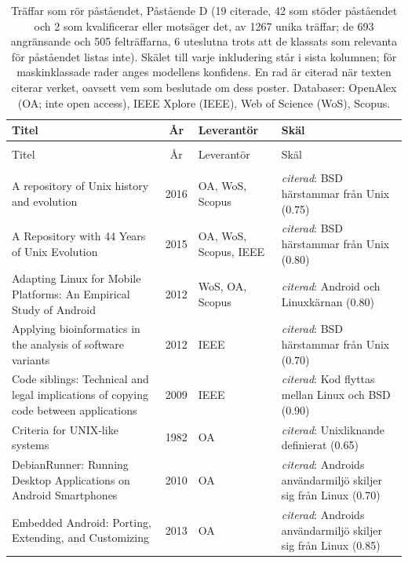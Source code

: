 \begin{longtable}{@{}%
  >{\raggedright\arraybackslash}p{}c%
  >{\raggedright\arraybackslash}p{}%
  >{\raggedright\arraybackslash}p{}@{}}
\caption{Träffar som rör påståendet, Påstående D (19 citerade, 42 som stöder påståendet och 2 som kvalificerar eller motsäger det, av 1267 unika träffar; de 693 angränsande och 505 felträffarna, 6 uteslutna trots att de klassats som relevanta för påståendet listas inte). Skälet till varje inkludering står i sista kolumnen; för maskinklassade rader anges modellens konfidens. En rad är citerad när texten citerar verket, oavsett vem som beslutade om dess poster. Databaser: OpenAlex (OA; inte open access), IEEE Xplore (IEEE), Web of Science (WoS), Scopus.}\label{tab:sok-unix-lineage}\\
\toprule
Titel & År & Leverantör & Skäl \\
\midrule
\endfirsthead
\multicolumn{4}{@{}l}{\emph{\tablename~\thetable{} (forts.)}}\\
\toprule
Titel & År & Leverantör & Skäl \\
\midrule
\endhead
\midrule \multicolumn{4}{r@{}}{\emph{forts.\ på nästa sida}}\\
\endfoot
\bottomrule
\endlastfoot
A repository of Unix history and evolution & 2016 & OA, WoS, Scopus & \emph{citerad}: BSD härstammar från Unix (0.75) \\
A Repository with 44 Years of Unix Evolution & 2015 & OA, WoS, Scopus, IEEE & \emph{citerad}: BSD härstammar från Unix (0.80) \\
Adapting Linux for Mobile Platforms: An Empirical Study of Android & 2012 & WoS, OA, Scopus & \emph{citerad}: Android och Linuxkärnan (0.80) \\
Applying bioinformatics in the analysis of software variants & 2012 & IEEE & \emph{citerad}: BSD härstammar från Unix (0.70) \\
Code siblings: Technical and legal implications of copying code between applications & 2009 & IEEE & \emph{citerad}: Kod flyttas mellan Linux och BSD (0.90) \\
Criteria for UNIX-like systems & 1982 & OA & \emph{citerad}: Unixliknande definierat (0.65) \\
DebianRunner: Running Desktop Applications on Android Smartphones & 2010 & OA & \emph{citerad}: Androids användarmiljö skiljer sig från Linux (0.70) \\
Embedded Android: Porting, Extending, and Customizing & 2013 & OA & \emph{citerad}: Androids användarmiljö skiljer sig från Linux (0.85) \\

\end{longtable}
